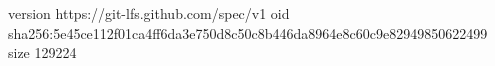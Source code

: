 version https://git-lfs.github.com/spec/v1
oid sha256:5e45ce112f01ca4ff6da3e750d8c50c8b446da8964e8c60c9e82949850622499
size 129224
